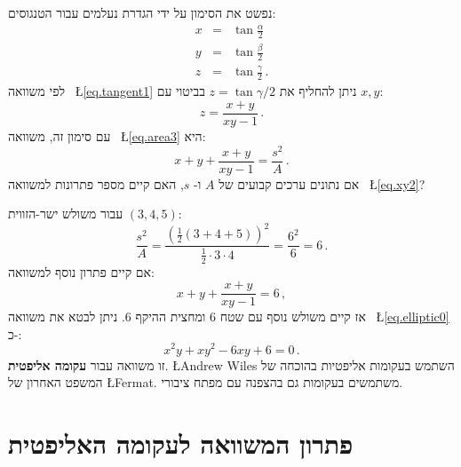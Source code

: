 \documentclass[12pt,a4paper]{article}
\begin{document}
נפשט את הסימון על ידי הגדרת נעלמים עבור הטנגוסים:
\begin{eqnarray*}
x&=&\tan \frac{\alpha}{2}\\
y&=&\tan \frac{\beta}{2}\\
z&=&\tan \frac{\gamma}{2}\,.
\end{eqnarray*}
לפי משוואה%
~\L{\ref{eq.tangent1}}
ניתן להחליף את
$z=\tan\gamma/2$
בביטוי עם 
$x,y$:
\begin{equation}
z = \frac{x+y}{xy-1}\,.\label{eq.xy1}
\end{equation}
עם סימון זה, משוואה
~\L{\ref{eq.area3}}
היא:
\begin{equation}
x+y+\frac{x+y}{xy-1}=\frac{s^2}{A}\,.\label{eq.xy2}
\end{equation}
אם נתונים ערכים קבועים של 
$A$
ו-%
$s$,
האם קיים מספר פתרונות  למשוואה%
~\L{\ref{eq.xy2}}?

עבור משולש ישר-הזווית
$(3,4,5)$:
\begin{equation}
\frac{s^2}{A} = \frac{\left(\frac{1}{2}(3+4+5)\right)^2}{\frac{1}{2}\cdot 3\cdot 4} = \frac{6^2}{6}=6\,.
\end{equation}
אם קיים פתרון נוסף למשוואה:
\begin{equation}
x+y+\frac{x+y}{xy-1}=6\,,\label{eq.elliptic0}
\end{equation}
אז קיים משולש נוסף עם שטח
$6$
ומחצית ההיקף
$6$.
ניתן לבטא את משוואה%
~\L{\ref{eq.elliptic0}}
כ-:
\begin{equation}
x^2y + xy^2 -6xy + 6 = 0\,.\label{eq.elliptic}
\end{equation}
זו משוואה עבור
\textbf{עקומה אליפטית}.
\L{Andrew Wiles}
השתמש בעקומות אליפטיות בהוכחה של המשפט האחרון של
\L{Fermat}.
משתמשים בעקומות גם בהצפנה עם מפתח ציבורי.

\section{פתרון המשוואה לעקומה האליפטית}
\end{document}
